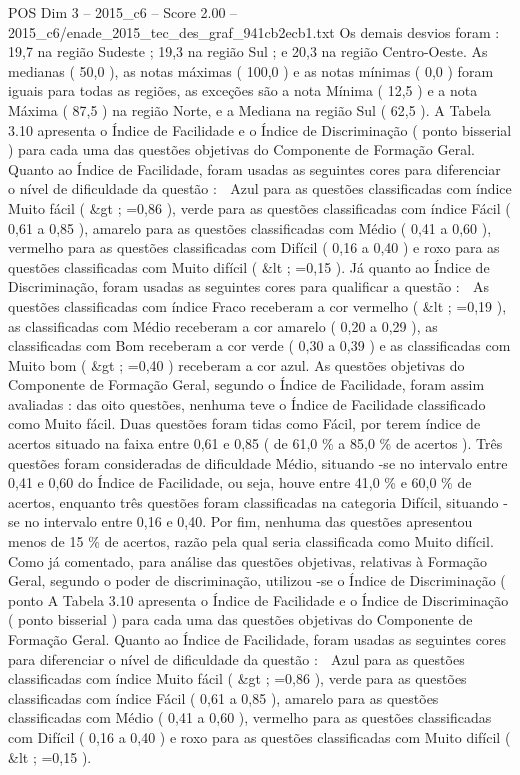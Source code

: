 \begin{textsample}{POS Dim 3 – 2015\_c6 – Score 2.00 – 2015\_c6/enade\_2015\_tec\_des\_graf\_941cb2ecb1.txt}
Os demais desvios foram : 19,7 na região Sudeste ; 19,3 na região Sul ; e 20,3 na região Centro-Oeste.
As medianas ( 50,0 ), as notas máximas ( 100,0 ) e as notas mínimas ( 0,0 ) foram iguais para todas as regiões, as exceções são a nota Mínima ( 12,5 ) e a nota Máxima ( 87,5 ) na região Norte, e a Mediana na região Sul ( 62,5 ).
A Tabela 3.10 apresenta o Índice de Facilidade e o Índice de Discriminação ( ponto bisserial ) para cada uma das questões objetivas do Componente de Formação Geral.
Quanto ao Índice de Facilidade, foram usadas as seguintes cores para diferenciar o nível de dificuldade da questão :  Azul para as questões classificadas com índice Muito fácil ( \&gt ; =0,86 ), verde para as questões classificadas com índice Fácil ( 0,61 a 0,85 ), amarelo para as questões classificadas com Médio ( 0,41 a 0,60 ), vermelho para as questões classificadas com Difícil ( 0,16 a 0,40 ) e roxo para as questões classificadas com Muito difícil ( \&lt ; =0,15 ).
Já quanto ao Índice de Discriminação, foram usadas as seguintes cores para qualificar a questão :  As questões classificadas com índice Fraco receberam a cor vermelho ( \&lt ; =0,19 ), as classificadas com Médio receberam a cor amarelo ( 0,20 a 0,29 ), as classificadas com Bom receberam a cor verde ( 0,30 a 0,39 ) e as classificadas com Muito bom ( \&gt ; =0,40 ) receberam a cor azul.
As questões objetivas do Componente de Formação Geral, segundo o Índice de Facilidade, foram assim avaliadas : das oito questões, nenhuma teve o Índice de Facilidade classificado como Muito fácil.
Duas questões foram tidas como Fácil, por terem índice de acertos situado na faixa entre 0,61 e 0,85 ( de 61,0 \% a 85,0 \% de acertos ).
Três questões foram consideradas de dificuldade Médio, situando -se no intervalo entre 0,41 e 0,60 do Índice de Facilidade, ou seja, houve entre 41,0 \% e 60,0 \% de acertos, enquanto três questões foram classificadas na categoria Difícil, situando -se no intervalo entre 0,16 e 0,40.
Por fim, nenhuma das questões apresentou menos de 15 \% de acertos, razão pela qual seria classificada como Muito difícil.
Como já comentado, para análise das questões objetivas, relativas à Formação Geral, segundo o poder de discriminação, utilizou -se o Índice de Discriminação ( ponto A Tabela 3.10 apresenta o Índice de Facilidade e o Índice de Discriminação ( ponto bisserial ) para cada uma das questões objetivas do Componente de Formação Geral.
Quanto ao Índice de Facilidade, foram usadas as seguintes cores para diferenciar o nível de dificuldade da questão :  Azul para as questões classificadas com índice Muito fácil ( \&gt ; =0,86 ), verde para as questões classificadas com índice Fácil ( 0,61 a 0,85 ), amarelo para as questões classificadas com Médio ( 0,41 a 0,60 ), vermelho para as questões classificadas com Difícil ( 0,16 a 0,40 ) e roxo para as questões classificadas com Muito difícil ( \&lt ; =0,15 ).

\end{textsample}
